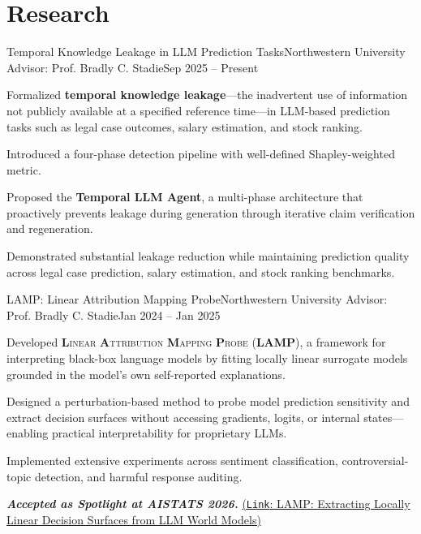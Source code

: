 \section{Research}
\resumeSubHeadingListStart

        \resumeSubheading
        {Temporal Knowledge Leakage in LLM Prediction Tasks}{Northwestern University}
        {Advisor: Prof. Bradly C. Stadie}{Sep 2025 – Present}
        \resumeItemListStart
        \item\small
        Formalized \textbf{temporal knowledge leakage}—the inadvertent use of information not publicly available at a specified reference time—in LLM-based prediction tasks such as legal case outcomes, salary estimation, and stock ranking.
        \item\small
        Introduced a four-phase detection pipeline with well-defined Shapley-weighted metric. 
        \item\small
        Proposed the \textbf{Temporal LLM Agent}, a multi-phase architecture that proactively prevents leakage during generation through iterative claim verification and regeneration.
        \item\small
        Demonstrated substantial leakage reduction while maintaining prediction quality across legal case prediction, salary estimation, and stock ranking benchmarks.
        \resumeItemListEnd

        \resumeSubheading
        {LAMP: Linear Attribution Mapping Probe}{Northwestern University}
        {Advisor: Prof. Bradly C. Stadie}{Jan 2024 – Jan 2025}
        \resumeItemListStart
        \item\small
        Developed \textsc{\textbf{L}inear \textbf{A}ttribution \textbf{M}apping \textbf{P}robe (\textbf{LAMP})}, a framework for interpreting black-box language models by fitting locally linear surrogate models grounded in the model's own self-reported explanations.
        \item\small
        Designed a perturbation-based method to probe model prediction sensitivity and extract decision surfaces without accessing gradients, logits, or internal states—enabling practical interpretability for proprietary LLMs.
        \item\small
        Implemented extensive experiments across sentiment classification, controversial-topic detection, and harmful response auditing.
        \item\small
        \textit{\textbf{Accepted as Spotlight at AISTATS 2026.}} \href{https://openreview.net/forum?id=mynHcPXsMv}{(\texttt{Link}: LAMP: Extracting Locally Linear Decision Surfaces from LLM World Models)}
        \resumeItemListEnd


